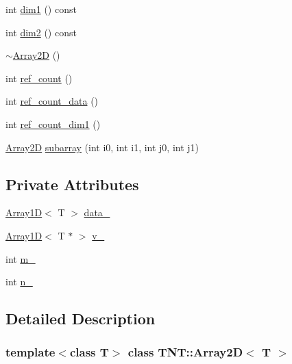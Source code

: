 \begin{DoxyCompactItemize}
\item 
int \hyperlink{classTNT_1_1Array2D_a84da0cfbe21a838fc85e1bac304e57ba}{dim1} () const
\item 
int \hyperlink{classTNT_1_1Array2D_adb4020fe0eb3cd695080a9c56a1d7c5c}{dim2} () const
\item 
\hyperlink{classTNT_1_1Array2D_a87c0133fa83755104b75631cfa4d6ab7}{$\sim$\+Array2D} ()
\item 
int \hyperlink{classTNT_1_1Array2D_a1669732a1a744a212c0c23b0cbafb1f1}{ref\+\_\+count} ()
\item 
int \hyperlink{classTNT_1_1Array2D_adb80c979d57de1fc4422a683703027b9}{ref\+\_\+count\+\_\+data} ()
\item 
int \hyperlink{classTNT_1_1Array2D_a8f4e8eca39d733e01642f35df5b4484b}{ref\+\_\+count\+\_\+dim1} ()
\item 
\hyperlink{classTNT_1_1Array2D}{Array2D} \hyperlink{classTNT_1_1Array2D_accf36569414a2570497d2a3f9fe68f52}{subarray} (int i0, int i1, int j0, int j1)
\end{DoxyCompactItemize}
\subsection*{Private Attributes}
\begin{DoxyCompactItemize}
\item 
\hyperlink{classTNT_1_1Array1D}{Array1D}$<$ T $>$ \hyperlink{classTNT_1_1Array2D_afb5d79a6c51d8d27121a982aaff4bc47}{data\+\_\+}
\item 
\hyperlink{classTNT_1_1Array1D}{Array1D}$<$ T $\ast$ $>$ \hyperlink{classTNT_1_1Array2D_a7752a958a6c55bd094ce2c987aa78546}{v\+\_\+}
\item 
int \hyperlink{classTNT_1_1Array2D_ad866fbd5cb16df751ebf9e4eea6f2f22}{m\+\_\+}
\item 
int \hyperlink{classTNT_1_1Array2D_a4a182694802765bdb358f9737ab922b1}{n\+\_\+}
\end{DoxyCompactItemize}


\subsection{Detailed Description}
\subsubsection*{template$<$class T$>$\newline
class T\+N\+T\+::\+Array2\+D$<$ T $>$}



